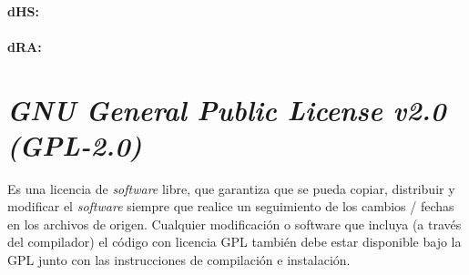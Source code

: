 \paragraph{dHS:}
\paragraph{dRA:}


\section{\textit{GNU General Public License v2.0 (GPL-2.0) }}

	Es una licencia de \textit{software} libre, que garantiza que se pueda copiar, distribuir y modificar el \textit{software} siempre que realice un seguimiento de los cambios / fechas en los archivos de origen. Cualquier modificación o software que incluya (a trav\'es del compilador) el código con licencia GPL también debe estar disponible bajo la GPL junto con las instrucciones de compilación e instalación.